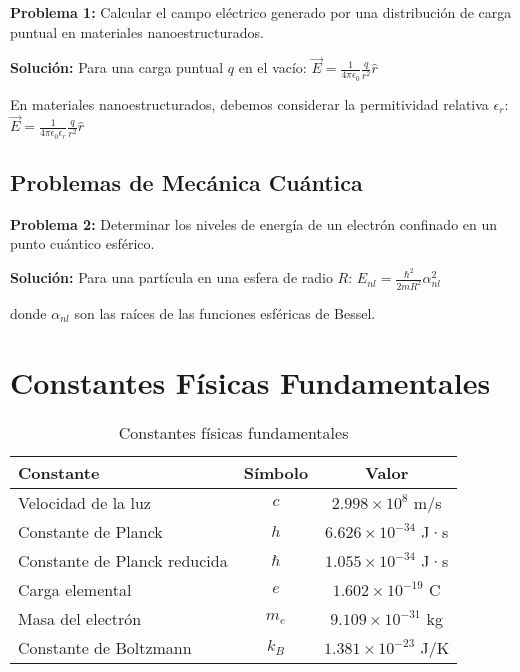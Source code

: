 \documentclass[12pt,a4paper,twoside]{book}
\begin{document}
	\textbf{Problema 1:} Calcular el campo eléctrico generado por una distribución de carga puntual en materiales nanoestructurados.
	
	\textbf{Solución:}
	Para una carga puntual $q$ en el vacío:
	$\vec{E} = \frac{1}{4\pi\epsilon_0} \frac{q}{r^2} \hat{r}$
	
	En materiales nanoestructurados, debemos considerar la permitividad relativa $\epsilon_r$:
	$\vec{E} = \frac{1}{4\pi\epsilon_0\epsilon_r} \frac{q}{r^2} \hat{r}$
	
	\section{Problemas de Mecánica Cuántica}
	\label{sec:problemas_cuantica}
	
	\textbf{Problema 2:} Determinar los niveles de energía de un electrón confinado en un punto cuántico esférico.
	
	\textbf{Solución:}
	Para una partícula en una esfera de radio $R$:
	$E_{nl} = \frac{\hbar^2}{2mR^2} \alpha_{nl}^2$
	
	donde $\alpha_{nl}$ son las raíces de las funciones esféricas de Bessel.
	
	\appendix
	\chapter{Constantes Físicas Fundamentales}
	
	\begin{table}[H]
		\centering
		\begin{tabular}{@{}lcc@{}}
			\toprule
			\textbf{Constante} & \textbf{Símbolo} & \textbf{Valor} \\
			\midrule
			Velocidad de la luz & $c$ & $2.998 \times 10^8$ m/s \\
			Constante de Planck & $h$ & $6.626 \times 10^{-34}$ J·s \\
			Constante de Planck reducida & $\hbar$ & $1.055 \times 10^{-34}$ J·s \\
			Carga elemental & $e$ & $1.602 \times 10^{-19}$ C \\
			Masa del electrón & $m_e$ & $9.109 \times 10^{-31}$ kg \\
			Constante de Boltzmann & $k_B$ & $1.381 \times 10^{-23}$ J/K \\
			\bottomrule
		\end{tabular}
		\caption{Constantes físicas fundamentales}
	\end{table}
	
\end{document}
